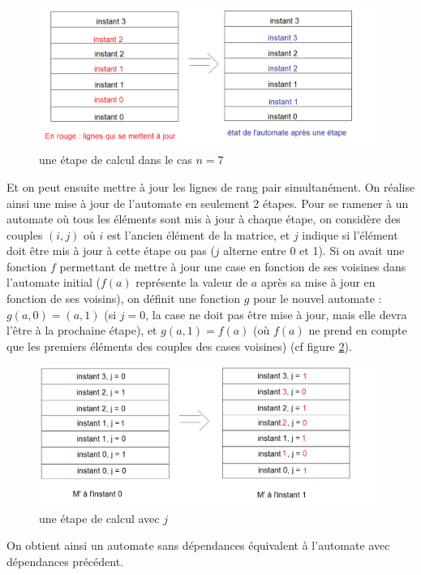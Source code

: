 \documentclass[a4paper,11pt]{article}
\begin{document}
\begin{figure}[!h]
\includegraphics[scale=0.45]{1ere_etape.png}
\caption{une étape de calcul dans le cas $n = 7$}
\label{1ere_etape}
\end{figure}

Et on peut ensuite mettre à jour les lignes de rang pair simultanément. On réalise ainsi une mise à jour de l'automate en seulement 2 étapes. Pour se ramener à un automate où tous les éléments sont mis à jour à chaque étape, on considère des couples $(i,j)$ où $i$ est l'ancien élément de la matrice, et $j$ indique si l'élément doit être mis à jour à cette étape ou pas ($j$ alterne entre 0 et 1).
Si on avait une fonction $f$ permettant de mettre à jour une case en fonction de ses voisines dans l'automate initial ($f(a)$ représente la valeur de $a$ après sa mise à jour en fonction de ses voisins), on définit une fonction $g$ pour le nouvel automate : $g(a,0) = (a,1)$ (si $j = 0$, la case ne doit pas être mise à jour, mais elle devra l'être à la prochaine étape), et $g(a,1) = f(a)$ (où $f(a)$ ne prend en compte que les premiers éléments des couples des cases voisines) (cf figure \ref{avec_j}).\\
\begin{figure}[!h]
\includegraphics[scale=0.5]{avec_j.png}
\caption{une étape de calcul avec $j$}
\label{avec_j}
\end{figure}

On obtient ainsi un automate sans dépendances équivalent à l'automate avec dépendances précédent.
\end{document}
